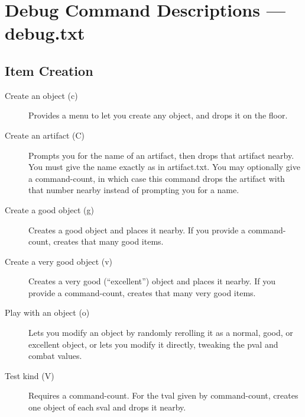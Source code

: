 \section{Debug Command Descriptions --- debug.txt}
\subsection{Item Creation}
\begin{description}
\item[Create an object (c)]
    Provides a menu to let you create any object, and drops it on the
    floor.

\item[Create an artifact (C)]
    Prompts you for the name of an artifact, then drops that artifact
    nearby. You must give the name exactly as in artifact.txt. You may
    optionally give a command-count, in which case this command drops the
    artifact with that number nearby instead of prompting you for a name.

\item[Create a good object (g)]
    Creates a good object and places it nearby. If you provide a command-
    count, creates that many good items.

\item[Create a very good object (v)]
    Creates a very good (``excellent'') object and places it nearby. If you
    provide a command-count, creates that many very good items.

\item[Play with an object (o)]
    Lets you modify an object by randomly rerolling it as a normal, good,
    or excellent object, or lets you modify it directly, tweaking the pval
    and combat values.

\item[Test kind (V)]
    Requires a command-count. For the tval given by command-count, creates
    one object of each sval and drops it nearby.
\end{description}

